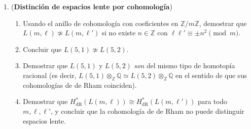 \documentclass[11pt,a4paper]{article}
\theoremstyle{plain}
\theoremstyle{definition}
\theoremstyle{remark}
\newcommand{\ZZ}{\mathbb Z}
\newcommand{\QQ}{\mathbb Q}
\begin{document}
\begin{enumerate}[label=\arabic*.,leftmargin=*]
\item (\textbf{Distinción de espacios lente por cohomología})
\label{ex:distincion-lente}
\begin{enumerate}[label=\alph*)]
\item Usando el anillo de cohomología con coeficientes en $\ZZ/m\ZZ$,
demostrar que $L(m,\ell)\not\simeq L(m,\ell')$ si no existe $n\in\ZZ$ con
$\ell\ell'\equiv\pm n^2\pmod m$.
\item Concluir que $L(5,1)\not\simeq L(5,2)$.
\item Demostrar que $L(5,1)$ y $L(5,2)$ \emph{son} del mismo tipo de
homotopía racional (es decir, $L(5,1)\otimes_\ZZ\QQ\simeq L(5,2)\otimes_\ZZ\QQ$
en el sentido de que sus cohomologías de de Rham coinciden).
\item Demostrar que $H^*_{\mathrm{dR}}(L(m,\ell))\cong H^*_{\mathrm{dR}}(L(m,\ell'))$
para todo $m,\ell,\ell'$, y concluir que la cohomología de de Rham no
puede distinguir espacios lente.
\end{enumerate}


\end{enumerate}
\end{document}
